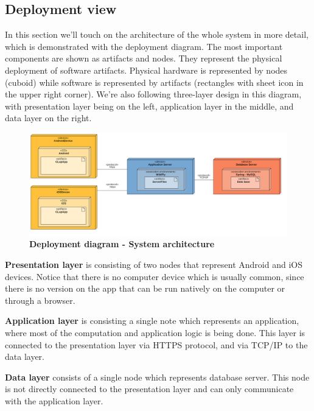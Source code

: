 \subsection{Deployment view}
\hspace{\parindent} In this section we'll touch on the architecture of the whole system in more detail, which is demonstrated with the deployment diagram. The most important components are shown as artifacts and nodes. They represent the physical deployment of software artifacts. Physical hardware is represented by nodes (cuboid) while software is represented by artifacts (rectangles with sheet icon in the upper right corner). We're also following three-layer design in this diagram, with presentation layer being on the left, application layer in the middle, and data layer on the right.   

\begin{figure}[!h]
\centering
\includegraphics[width=\textwidth]{Images/DeploymentDiagram1v2}
\caption{\label{fig:deploymentdiagram}\textbf{Deployment diagram -  System architecture}}
\end{figure}


\textbf{Presentation layer} is consisting of two nodes that represent Android and iOS devices. Notice that there is no computer device which is usually common, since there is no version on the app that can be run natively on the computer or through a browser.   

  

\textbf{Application layer }is consisting a single note which represents an application, where most of the computation and application logic is being done. This layer is connected to the presentation layer via HTTPS protocol, and via TCP/IP to the data layer.  

  

\textbf{Data layer} consists of a single node which represents database server. This node is not directly connected to the presentation layer and can only communicate with the application layer.  

